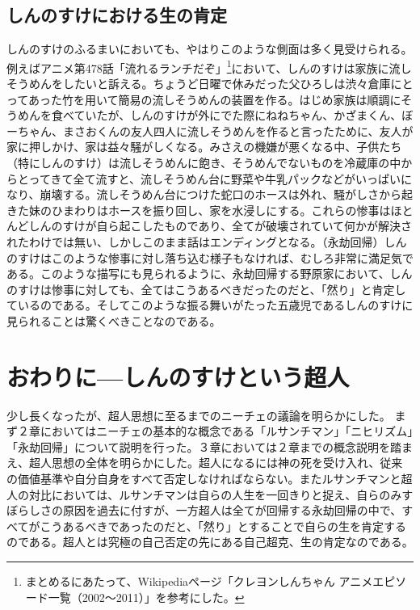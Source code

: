 \documentclass[b5j,twoside,twocolumn]{utarticle}
\begin{document}
\subsection{しんのすけにおける生の肯定}
しんのすけのふるまいにおいても、やはりこのような側面は多く見受けられる。例えばアニメ第478話「流れるランチだぞ」\footnote{まとめるにあたって、Wikipediaページ「クレヨンしんちゃん アニメエピソード一覧（2002～2011）」を参考にした。}において、しんのすけは家族に流しそうめんをしたいと訴える。ちょうど日曜で休みだった父ひろしは渋々倉庫にとってあった竹を用いて簡易の流しそうめんの装置を作る。はじめ家族は順調にそうめんを食べていたが、しんのすけが外にでた際にねねちゃん、かざまくん、ぼーちゃん、まさおくんの友人四人に流しそうめんを作ると言ったために、友人が家に押しかけ、家は益々騒がしくなる。みさえの機嫌が悪くなる中、子供たち（特にしんのすけ）は流しそうめんに飽き、そうめんでないものを冷蔵庫の中からとってきて全て流すと、流しそうめん台に野菜や牛乳パックなどがいっぱいになり、崩壊する。流しそうめん台につけた蛇口のホースは外れ、騒がしさから起きた妹のひまわりはホースを振り回し、家を水浸しにする。これらの惨事はほとんどしんのすけが自ら起こしたものであり、全てが破壊されていて何かが解決されたわけでは無い、しかしこのまま話はエンディングとなる。（永劫回帰）しんのすけはこのような惨事に対し落ち込む様子もなければ、むしろ非常に満足気である。このような描写にも見られるように、永劫回帰する野原家において、しんのすけは惨事に対しても、全てはこうあるべきだったのだと、「然り」と肯定しているのである。そしてこのような振る舞いがたった五歳児であるしんのすけに見られることは驚くべきことなのである。


\section{おわりに---しんのすけという超人}
少し長くなったが、超人思想に至るまでのニーチェの議論を明らかにした。
まず２章においてはニーチェの基本的な概念である「ルサンチマン」「ニヒリズム」「永劫回帰」について説明を行った。３章においては２章までの概念説明を踏まえ、超人思想の全体を明らかにした。超人になるには神の死を受け入れ、従来の価値基準や自分自身をすべて否定しなければならない。またルサンチマンと超人の対比においては、ルサンチマンは自らの人生を一回きりと捉え、自らのみすぼらしさの原因を過去に付すが、一方超人は全てが回帰する永劫回帰の中で、すべてがこうあるべきであったのだと、「然り」とすることで自らの生を肯定するのである。超人とは究極の自己否定の先にある自己超克、生の肯定なのである。
\end{document}

